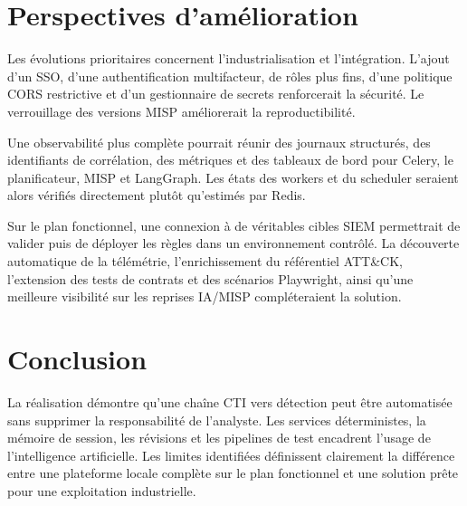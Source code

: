 \section{Perspectives d'amélioration}

Les évolutions prioritaires concernent l'industrialisation et l'intégration. L'ajout d'un SSO, d'une authentification multifacteur, de rôles plus fins, d'une politique CORS restrictive et d'un gestionnaire de secrets renforcerait la sécurité. Le verrouillage des versions MISP améliorerait la reproductibilité.

Une observabilité plus complète pourrait réunir des journaux structurés, des identifiants de corrélation, des métriques et des tableaux de bord pour Celery, le planificateur, MISP et LangGraph. Les états des workers et du scheduler seraient alors vérifiés directement plutôt qu'estimés par Redis.

Sur le plan fonctionnel, une connexion à de véritables cibles SIEM permettrait de valider puis de déployer les règles dans un environnement contrôlé. La découverte automatique de la télémétrie, l'enrichissement du référentiel ATT\&CK, l'extension des tests de contrats et des scénarios Playwright, ainsi qu'une meilleure visibilité sur les reprises IA/MISP compléteraient la solution.

\section{Conclusion}

La réalisation démontre qu'une chaîne CTI vers détection peut être automatisée sans supprimer la responsabilité de l'analyste. Les services déterministes, la mémoire de session, les révisions et les pipelines de test encadrent l'usage de l'intelligence artificielle. Les limites identifiées définissent clairement la différence entre une plateforme locale complète sur le plan fonctionnel et une solution prête pour une exploitation industrielle.